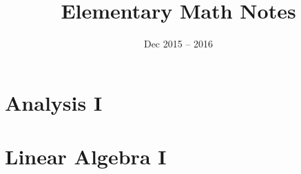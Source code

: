 \documentclass{article}
\title{Elementary Math Notes}
\date{Dec 2015 -- 2016}
\begin{document}
\doparttoc

\maketitle

\newpage
\setcounter{tocdepth}{1}
\tableofcontents
\newpage

\part{Analysis I}
\parttoc
\newpage

\newpage

\part{Linear Algebra I}
\parttoc
\newpage

\newpage
\end{document}
